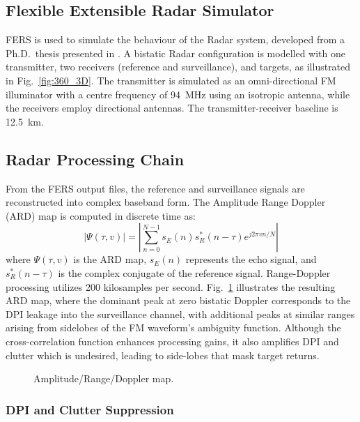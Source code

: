 \documentclass[conference]{IEEEtran}
\begin{document}
\subsection{Flexible Extensible Radar Simulator}

FERS is used to simulate the behaviour of the Radar system, developed from a Ph.D.\ thesis presented in \cite{fersMarc}. A bistatic Radar configuration is modelled with one transmitter, two receivers (reference and surveillance), and targets, as illustrated in Fig.~\ref{fig:360_3D}. The transmitter is simulated as an omni-directional FM illuminator with a centre frequency of 94~MHz using an isotropic antenna, while the receivers employ directional antennas. The transmitter-receiver baseline is 12.5~km.

\subsection{Radar Processing Chain}

From the FERS output files, the reference and surveillance signals are reconstructed into complex baseband form. The Amplitude Range Doppler (ARD) map is computed in discrete time as:
\begin{equation}
  \left| \Psi(\tau, v) \right| = \left| \sum_{n=0}^{N-1} s_E(n) s_R^*(n-\tau) e^{j 2\pi v n/N} \right|
\end{equation}
where $\Psi(\tau, v)$ is the ARD map, $s_E(n)$ represents the echo signal, and $s_R^*(n-\tau)$ is the complex conjugate of the reference signal. Range-Doppler processing utilizes 200 kilosamples per second. Fig.~\ref{fig:ardMap} illustrates the resulting ARD map, where the dominant peak at zero bistatic Doppler corresponds to the DPI leakage into the surveillance channel, with additional peaks at similar ranges arising from sidelobes of the FM waveform's ambiguity function. Although the cross-correlation function enhances processing gains, it also amplifies DPI and clutter which is undesired, leading to side-lobes that mask target returns.

\begin{figure}[t]
  \centering
  
  \caption{Amplitude/Range/Doppler map.}
  \label{fig:ardMap}
\end{figure}


\subsubsection{DPI and Clutter Suppression}
\end{document}
